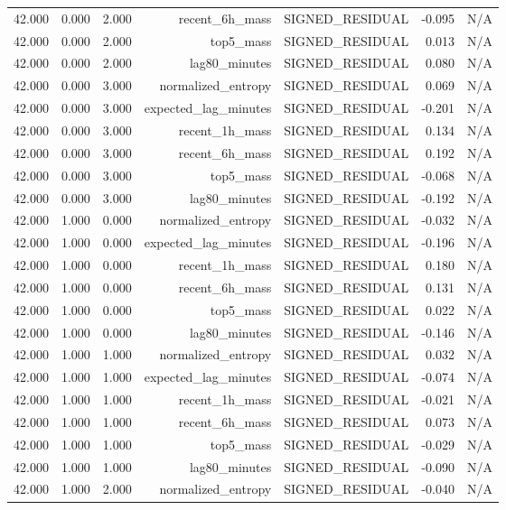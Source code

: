 \begin{table}[h!]
\begin{tabular}{lrrrrrr}
42.000 & 0.000 & 2.000 & recent\_6h\_mass & SIGNED\_RESIDUAL & -0.095 & N/A \\
42.000 & 0.000 & 2.000 & top5\_mass & SIGNED\_RESIDUAL & 0.013 & N/A \\
42.000 & 0.000 & 2.000 & lag80\_minutes & SIGNED\_RESIDUAL & 0.080 & N/A \\
42.000 & 0.000 & 3.000 & normalized\_entropy & SIGNED\_RESIDUAL & 0.069 & N/A \\
42.000 & 0.000 & 3.000 & expected\_lag\_minutes & SIGNED\_RESIDUAL & -0.201 & N/A \\
42.000 & 0.000 & 3.000 & recent\_1h\_mass & SIGNED\_RESIDUAL & 0.134 & N/A \\
42.000 & 0.000 & 3.000 & recent\_6h\_mass & SIGNED\_RESIDUAL & 0.192 & N/A \\
42.000 & 0.000 & 3.000 & top5\_mass & SIGNED\_RESIDUAL & -0.068 & N/A \\
42.000 & 0.000 & 3.000 & lag80\_minutes & SIGNED\_RESIDUAL & -0.192 & N/A \\
42.000 & 1.000 & 0.000 & normalized\_entropy & SIGNED\_RESIDUAL & -0.032 & N/A \\
42.000 & 1.000 & 0.000 & expected\_lag\_minutes & SIGNED\_RESIDUAL & -0.196 & N/A \\
42.000 & 1.000 & 0.000 & recent\_1h\_mass & SIGNED\_RESIDUAL & 0.180 & N/A \\
42.000 & 1.000 & 0.000 & recent\_6h\_mass & SIGNED\_RESIDUAL & 0.131 & N/A \\
42.000 & 1.000 & 0.000 & top5\_mass & SIGNED\_RESIDUAL & 0.022 & N/A \\
42.000 & 1.000 & 0.000 & lag80\_minutes & SIGNED\_RESIDUAL & -0.146 & N/A \\
42.000 & 1.000 & 1.000 & normalized\_entropy & SIGNED\_RESIDUAL & 0.032 & N/A \\
42.000 & 1.000 & 1.000 & expected\_lag\_minutes & SIGNED\_RESIDUAL & -0.074 & N/A \\
42.000 & 1.000 & 1.000 & recent\_1h\_mass & SIGNED\_RESIDUAL & -0.021 & N/A \\
42.000 & 1.000 & 1.000 & recent\_6h\_mass & SIGNED\_RESIDUAL & 0.073 & N/A \\
42.000 & 1.000 & 1.000 & top5\_mass & SIGNED\_RESIDUAL & -0.029 & N/A \\
42.000 & 1.000 & 1.000 & lag80\_minutes & SIGNED\_RESIDUAL & -0.090 & N/A \\
42.000 & 1.000 & 2.000 & normalized\_entropy & SIGNED\_RESIDUAL & -0.040 & N/A \\

\end{tabular}
\end{table}
